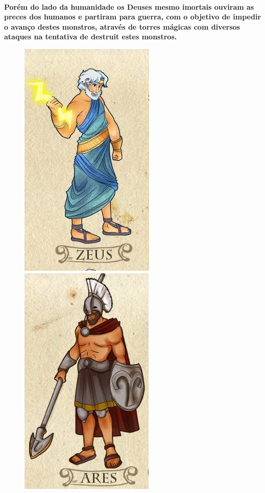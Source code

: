\documentclass[11pt]{article} %
\begin{document}
\paragraph{}\textbf{Porém do lado da humanidade os Deuses mesmo imortais ouviram as preces dos humanos e partiram para guerra, com o objetivo de impedir o avanço destes monstros, através de torres mágicas com diversos ataques na tentativa de destruit estes monstros.}

\begin{figure}[!htp]
\centering
\includegraphics[scale=0.3]{res/zeus.png} \quad
\includegraphics[scale=0.3]{res/ares.png} \quad

\end{figure}
\end{document}
